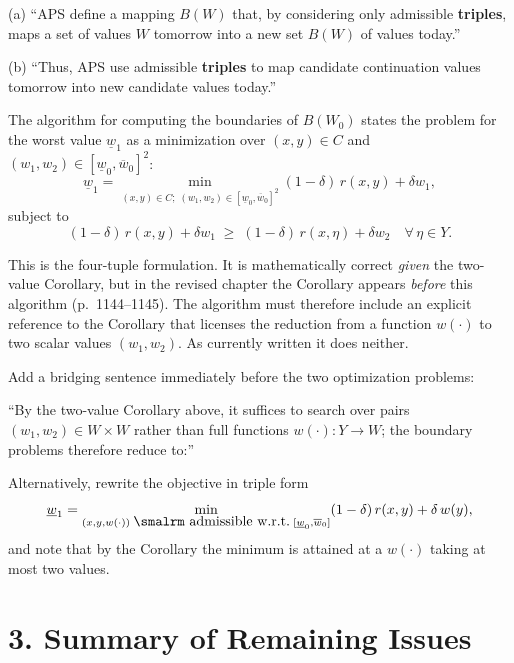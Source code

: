 \vskip4pt
\noindent (a) ``APS define a mapping $B(W)$ that, by considering only
admissible {\bf triples}, maps a set of values $W$ tomorrow into a new
set $B(W)$ of values today.''

\vskip2pt
\noindent (b) ``Thus, APS use admissible {\bf triples} to map candidate
continuation values tomorrow into new candidate values today.''


The algorithm for computing the boundaries of $B(W_0)$ states the
problem for the worst value $\underline w_1$ as a minimization over
$(x,y)\in C$ and $(w_1,w_2)\in[\underline w_0,\overline w_0]^2$:
$$\underline w_1
  = \min_{\scriptstyle(x,y)\in C;\;(w_1,w_2)\in[\underline w_0,
    \overline w_0]^2}
    (1-\delta)\,r(x,y)+\delta w_1,$$
subject to
$$(1-\delta)\,r(x,y)+\delta w_1\;\geq\;
  (1-\delta)\,r(x,\eta)+\delta w_2\quad\forall\,\eta\in Y.$$

This is the four-tuple formulation.  It is mathematically correct
{\it given\/} the two-value Corollary, but in the revised chapter the
Corollary appears {\it before\/} this algorithm (p.~1144--1145).  The
algorithm must therefore include an explicit reference to the Corollary
that licenses the reduction from a function $w(\cdot)$ to two scalar
values $(w_1,w_2)$.  As currently written it does neither.

\vskip6pt\enspace
Add a bridging sentence immediately before the two optimization problems:

\bquote
``By the two-value Corollary above, it suffices to search over pairs
$(w_1,w_2)\in W\times W$ rather than full functions $w(\cdot):Y\to W$;
the boundary problems therefore reduce to:''
\ebquote

\noindent Alternatively, rewrite the objective in triple form
$$\underline w_1
  = \min_{\scriptstyle(x,y,w(\cdot))\;\hbox{\smalrm admissible w.r.t.}\;
    [\underline w_0,\overline w_0]}
    (1-\delta)\,r(x,y)+\delta\,w(y),$$
and note that by the Corollary the minimum is attained at a $w(\cdot)$
taking at most two values.

\section{3. Summary of Remaining Issues}

\vskip6pt
\noindent
{}

